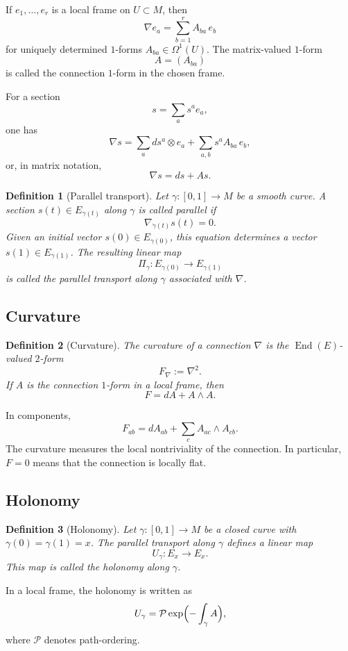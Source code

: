 \documentclass[pdflatex,sn-mathphys-num]{sn-jnl}%
\theoremstyle{thmstyleone}%
\theoremstyle{thmstyletwo}%
\theoremstyle{thmstylethree}%
\newtheorem{definition}{Definition}%
\begin{document}
\begin{appendices}
If $e_1,\dots,e_r$ is a local frame on $U\subset M$, then
\[
\nabla e_a=\sum_{b=1}^r A_{ba}\, e_b
\]
for uniquely determined $1$-forms $A_{ba}\in \Omega^1(U)$. The matrix-valued $1$-form
\[
A=(A_{ba})
\]
is called the connection $1$-form in the chosen frame.

For a section
\[
s=\sum_a s^a e_a,
\]
one has
\[
\nabla s=\sum_a ds^a\otimes e_a+\sum_{a,b}s^a A_{ba}\,e_b,
\]
or, in matrix notation,
\[
\nabla s=d s + A s.
\]

\begin{definition}[Parallel transport]
Let $\gamma:[0,1]\to M$ be a smooth curve. A section $s(t)\in E_{\gamma(t)}$ along $\gamma$ is called parallel if
\[
\nabla_{\dot\gamma(t)}s(t)=0.
\]
Given an initial vector $s(0)\in E_{\gamma(0)}$, this equation determines a vector $s(1)\in E_{\gamma(1)}$. The resulting linear map
\[
\Pi_\gamma:E_{\gamma(0)}\to E_{\gamma(1)}
\]
is called the parallel transport along $\gamma$ associated with $\nabla$.
\end{definition}

\subsection{Curvature}

\begin{definition}[Curvature]
The curvature of a connection $\nabla$ is the $\operatorname{End}(E)$-valued $2$-form
\[
F_\nabla:=\nabla^2.
\]
If $A$ is the connection $1$-form in a local frame, then
\[
F=dA+A\wedge A.
\]
\end{definition}

In components,
\[
F_{ab}=dA_{ab}+\sum_c A_{ac}\wedge A_{cb}.
\]
The curvature measures the local nontriviality of the connection. In particular, $F=0$ means that the connection is locally flat.

\subsection{Holonomy}

\begin{definition}[Holonomy]
Let $\gamma:[0,1]\to M$ be a closed curve with $\gamma(0)=\gamma(1)=x$. The parallel transport along $\gamma$ defines a linear map
\[
U_\gamma:E_x\to E_x.
\]
This map is called the holonomy along $\gamma$.
\end{definition}

In a local frame, the holonomy is written as
\[
U_\gamma=\mathcal{P}\exp\Bigl(-\int_\gamma A\Bigr),
\]
where $\mathcal{P}$ denotes path-ordering.


\end{appendices}
\end{document}
